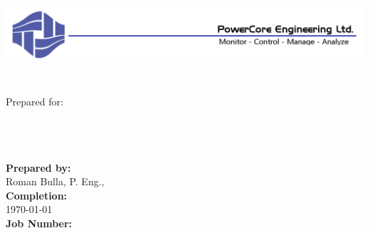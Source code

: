 \begin{titlepage}
\thispagestyle{empty}
\center %

\begin{center}
\includegraphics[height=1in, keepaspectratio=true]{../Images/PCEHeader.PNG}
\end{center}

\begin{center}
\vspace{20mm}
\Huge \DocTitle \\ %
\vspace{50mm}
\large Prepared for: \\
\LARGE\textbf{\Customer} \\
\large\textbf{\Target}\\
\small\textbf{\Address}\\
\end{center}



 
\begin{flushleft} \large
\vfill

\textbf{Prepared by:} \\
Roman Bulla, P. Eng., \PCERep \\
\vspace{12pt} 
\textbf{Completion:}\\
\today \\ 
\vspace{12pt} 
\textbf{Job Number:}\\
\JobNum \\
\end{flushleft}

\end{titlepage}
